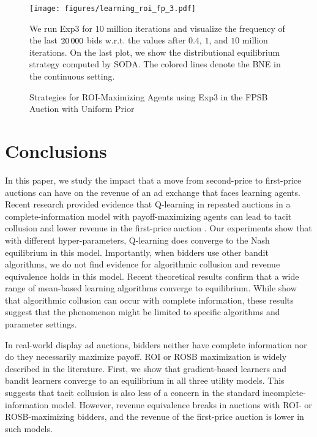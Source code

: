 \documentclass{article}
\begin{document}
\begin{figure}[h!]
	\begin{center}
		\texttt{[image: figures/learning\_roi\_fp\_3.pdf]}
		\caption{Strategies for ROI-Maximizing Agents using Exp3 in the FPSB Auction with Uniform Prior}
		\label{fig:exp3_roi}
	\end{center}
	\footnotesize
	We run Exp3 for $10$ million iterations and visualize the frequency of the last $20\thinspace000$ bids w.r.t. the values after $0.4$, 
	$1$, and $10$ million iterations. On the last plot, we show the distributional equilibrium strategy computed by SODA. The colored lines denote the BNE in the continuous setting.
\end{figure}

\section{Conclusions}
In this paper, we study the impact that a move from second-price to first-price auctions can have on the revenue of an ad exchange that faces learning agents.  
Recent research provided evidence that Q-learning in repeated auctions in a complete-information model with payoff-maximizing agents can lead to tacit collusion and lower revenue in the first-price auction \citep{banchio2022artificial}. 
Our experiments show that with different hyper-parameters, Q-learning does converge to the Nash equilibrium in this model. Importantly, when bidders use other bandit algorithms, we do not find evidence for algorithmic collusion and revenue equivalence holds in this model. Recent theoretical results confirm that a wide range of mean-based learning algorithms converge to equilibrium.
While \citet{banchio2022artificial} show that algorithmic collusion can occur with complete information, these results suggest that the phenomenon might be limited to specific algorithms and parameter settings.  

In real-world display ad auctions, bidders neither have complete information nor do they necessarily maximize payoff. ROI or ROSB maximization is widely described in the literature. First, we show that gradient-based learners and bandit learners converge to an equilibrium in all three utility models. This suggests that tacit collusion is also less of a concern in the standard incomplete-information model. However, revenue equivalence breaks in auctions with ROI- or ROSB-maximizing bidders, and the revenue of the first-price auction is lower in such models.
\end{document}
